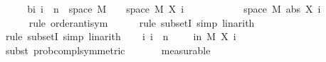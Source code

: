 \begin{isabellebody}
%
\isadelimproof
%
\endisadelimproof
%
\isatagproof
{}\isamarkupfalse%
\ {\isacharminus}{\kern0pt}\isanewline
\ \ \isamarkupfalse%
\ b{\isacharcolon}{\kern0pt}{\isachardoublequoteopen}{\isasymAnd}i{\isachardot}{\kern0pt}\ i\ {\isacharless}{\kern0pt}\ n\ {\isasymLongrightarrow}\ space\ M\ {\isacharminus}{\kern0pt}\ {\isacharbraceleft}{\kern0pt}{\isasymomega}\ {\isasymin}\ space\ M{\isachardot}{\kern0pt}\ X\ i\ {\isasymomega}\ {\isasymin}\ {\isacharbraceleft}{\kern0pt}{\isasymmu}\ {\isacharminus}{\kern0pt}\ {\isasymdelta}{\isachardot}{\kern0pt}{\isachardot}{\kern0pt}{\isasymmu}\ {\isacharplus}{\kern0pt}\ {\isasymdelta}{\isacharbraceright}{\kern0pt}{\isacharbraceright}{\kern0pt}\ {\isacharequal}{\kern0pt}\ \ {\isacharbraceleft}{\kern0pt}{\isasymomega}\ {\isasymin}\ space\ M{\isachardot}{\kern0pt}\ abs\ {\isacharparenleft}{\kern0pt}X\ i\ {\isasymomega}\ {\isacharminus}{\kern0pt}\ {\isasymmu}{\isacharparenright}{\kern0pt}\ {\isachargreater}{\kern0pt}\ {\isasymdelta}{\isacharbraceright}{\kern0pt}{\isachardoublequoteclose}\isanewline
\ \ \ \ \isamarkupfalse%
\ {\isacharparenleft}{\kern0pt}rule\ order{\isacharunderscore}{\kern0pt}antisym{\isacharparenright}{\kern0pt}\isanewline
\ \ \ \ \isamarkupfalse%
\ {\isacharparenleft}{\kern0pt}rule\ subsetI{\isacharcomma}{\kern0pt}\ simp{\isacharcomma}{\kern0pt}\ linarith{\isacharparenright}{\kern0pt}\isanewline
\ \ \ \ \isamarkupfalse%
\ {\isacharparenleft}{\kern0pt}rule\ subsetI{\isacharcomma}{\kern0pt}\ simp{\isacharcomma}{\kern0pt}\ linarith{\isacharparenright}{\kern0pt}\isanewline
\isanewline
\ \ \isamarkupfalse%
\ {\isachardoublequoteopen}{\isasymAnd}i{\isachardot}{\kern0pt}\ i\ {\isacharless}{\kern0pt}\ n\ {\isasymLongrightarrow}\ {}\ {\isacharminus}{\kern0pt}\ {\isasymP}{\isacharparenleft}{\kern0pt}{\isasymomega}\ in\ M{\isachardot}{\kern0pt}\ X\ i\ {\isasymomega}\ {\isasymin}\ {\isacharbraceleft}{\kern0pt}{\isasymmu}{\isacharminus}{\kern0pt}\ {\isasymdelta}{\isachardot}{\kern0pt}{\isachardot}{\kern0pt}{\isasymmu}{\isacharplus}{\kern0pt}{\isasymdelta}{\isacharbraceright}{\kern0pt}{\isacharparenright}{\kern0pt}\ {\isasymle}\ {}{\isacharslash}{\kern0pt}{}{\isachardoublequoteclose}\isanewline
\ \ \ \ \isamarkupfalse%
\ {\isacharparenleft}{\kern0pt}subst\ prob{\isacharunderscore}{\kern0pt}compl{\isacharbrackleft}{\kern0pt}symmetric{\isacharbrackright}{\kern0pt}{\isacharparenright}{\kern0pt}\isanewline
\ \ \ \ \ \isamarkupfalse%
\ {\isacharparenleft}{\kern0pt}measurable{\isacharparenright}{\kern0pt}\isanewline

\end{isabellebody}

